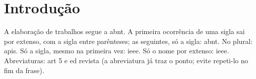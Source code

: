 \documentclass[12pt, a4paper, brazilian]{abntex2}
\newcommand{\listadesiglas}{{\renewcommand{\arraystretch}{1.5}%
  \printacronyms[exclude = abreviatura]}}
\newcommand{\listadeabreviaturas}{{\renewcommand{\arraystretch}{1.5}%
  \printacronyms[name = {Lista de abreviaturas}, include = abreviatura]}}
\begin{document}
\pretextual
\listadesiglas
\listadeabreviaturas

\textual
\chapter{Introdução}

A elaboração de trabalhos segue a \ac{abnt}. A primeira ocorrência de uma
sigla sai por extenso, com a sigla entre parênteses; as seguintes, só a
sigla: \ac{abnt}. No plural: \acp{api}. Só a sigla, mesmo na primeira vez:
\acs{ieee}. Só o nome por extenso: \acl{ieee}. Abreviaturas: \acs{art} 5 e
\acs{ed} revista (a abreviatura já traz o ponto; evite repeti-lo no fim da
frase).
\end{document}
